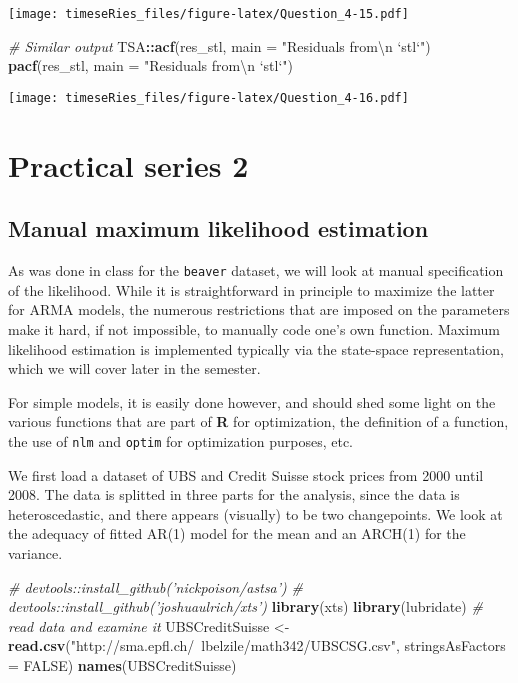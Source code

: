 \documentclass[]{book}
\newenvironment{Shaded}{\begin{snugshade}}{\end{snugshade}}
\newcommand{\KeywordTok}[1]{\textcolor[rgb]{0.13,0.29,0.53}{\textbf{#1}}}
\newcommand{\DataTypeTok}[1]{\textcolor[rgb]{0.13,0.29,0.53}{#1}}
\newcommand{\CharTok}[1]{\textcolor[rgb]{0.31,0.60,0.02}{#1}}
\newcommand{\StringTok}[1]{\textcolor[rgb]{0.31,0.60,0.02}{#1}}
\newcommand{\CommentTok}[1]{\textcolor[rgb]{0.56,0.35,0.01}{\textit{#1}}}
\newcommand{\OtherTok}[1]{\textcolor[rgb]{0.56,0.35,0.01}{#1}}
\newcommand{\OperatorTok}[1]{\textcolor[rgb]{0.81,0.36,0.00}{\textbf{#1}}}
\newcommand{\NormalTok}[1]{#1}
\begin{document}
\texttt{[image: timeseRies\_files/figure-latex/Question\_4-15.pdf]}

\begin{Shaded}
\begin{Highlighting}[]
\CommentTok{# Similar output}
\NormalTok{TSA}\OperatorTok{::}\KeywordTok{acf}\NormalTok{(res_stl, }\DataTypeTok{main =} \StringTok{"Residuals from}\CharTok{\textbackslash{}n}\StringTok{ `stl`"}\NormalTok{)}
\KeywordTok{pacf}\NormalTok{(res_stl, }\DataTypeTok{main =} \StringTok{"Residuals from}\CharTok{\textbackslash{}n}\StringTok{ `stl`"}\NormalTok{)}
\end{Highlighting}
\end{Shaded}

\texttt{[image: timeseRies\_files/figure-latex/Question\_4-16.pdf]}

\chapter{Practical series 2}\label{practical-series-2}

\section{Manual maximum likelihood
estimation}\label{manual-maximum-likelihood-estimation}

As was done in class for the \texttt{beaver} dataset, we will look at
manual specification of the likelihood. While it is straightforward in
principle to maximize the latter for ARMA models, the numerous
restrictions that are imposed on the parameters make it hard, if not
impossible, to manually code one's own function. Maximum likelihood
estimation is implemented typically via the state-space representation,
which we will cover later in the semester.

For simple models, it is easily done however, and should shed some light
on the various functions that are part of \textbf{R} for optimization,
the definition of a function, the use of \texttt{nlm} and \texttt{optim}
for optimization purposes, etc.

We first load a dataset of UBS and Credit Suisse stock prices from 2000
until 2008. The data is splitted in three parts for the analysis, since
the data is heteroscedastic, and there appears (visually) to be two
changepoints. We look at the adequacy of fitted AR(1) model for the mean
and an ARCH(1) for the variance.

\begin{Shaded}
\begin{Highlighting}[]
\CommentTok{# devtools::install_github('nickpoison/astsa')}
\CommentTok{# devtools::install_github('joshuaulrich/xts')}
\KeywordTok{library}\NormalTok{(xts)}
\KeywordTok{library}\NormalTok{(lubridate)}
\CommentTok{# read data and examine it}
\NormalTok{UBSCreditSuisse <-}\StringTok{ }\KeywordTok{read.csv}\NormalTok{(}\StringTok{"http://sma.epfl.ch/~lbelzile/math342/UBSCSG.csv"}\NormalTok{, }
    \DataTypeTok{stringsAsFactors =} \OtherTok{FALSE}\NormalTok{)}
\KeywordTok{names}\NormalTok{(UBSCreditSuisse)}
\end{Highlighting}
\end{Shaded}
\end{document}
